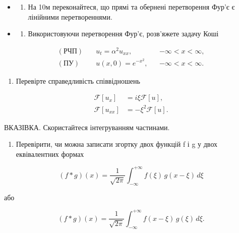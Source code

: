 \documentclass[
  ukrainian,
]{article}
\providecommand{\tightlist}{%
  \setlength{\itemsep}{0pt}\setlength{\parskip}{0pt}}
\begin{document}
\begin{itemize}
\tightlist
\item
  \begin{enumerate}
  \def\labelenumi{\arabic{enumi}.}
  \setcounter{enumi}{1}
  \tightlist
  \item
    На 10м переконайтеся, що прямі та обернені перетворення Фур'є є
    лінійними перетвореннями.
  \end{enumerate}
\item
  \begin{enumerate}
  \def\labelenumi{\arabic{enumi}.}
  \setcounter{enumi}{2}
  \tightlist
  \item
    Використовуючи перетворення Фур'є, розв'яжете задачу Коші
  \end{enumerate}
\end{itemize}

\[
\begin{aligned}
(\text{РЧП})\quad & u_t = \alpha^2 u_{xx}, && -\infty < x < \infty,\\
(\text{ПУ})\quad & u(x,0)=e^{-x^2}, && -\infty < x < \infty.
\end{aligned}
\]

\begin{enumerate}
\def\labelenumi{\arabic{enumi}.}
\setcounter{enumi}{3}
\tightlist
\item
  Перевірте справедливість співвідношень
\end{enumerate}

\[
\begin{aligned}
\mathcal{F}\left[u_{x}\right] &= i\xi \mathcal{F}\left[u\right], \\
\mathcal{F}\left[u_{xx}\right] &= -\xi^{2} \mathcal{F}\left[u\right].
\end{aligned}
\]

ВКАЗІВКА. Скористайтеся інтегруванням частинами.

\begin{enumerate}
\def\labelenumi{\arabic{enumi}.}
\setcounter{enumi}{4}
\tightlist
\item
  Перевірити, чи можна записати згортку двох функцій f і g у двох
  еквівалентних формах
\end{enumerate}

\[
(f * g)(x) = \frac{1}{\sqrt{2\pi}} \int_{-\infty}^{+\infty} f(\xi)\, g(x - \xi)\, d\xi
\]

або

\[
(f * g)(x) = \frac{1}{\sqrt{2\pi}} \int_{-\infty}^{+\infty} f(x-\xi)\, g(\xi)\, d\xi.
\]
\end{document}
